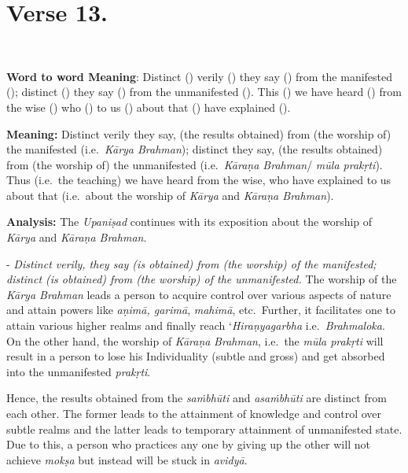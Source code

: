 \chapter{Verse 13.}

\begin{moolashloka}
\\
\end{moolashloka}

\textbf{Word to word Meaning}: Distinct () verily () they say () from the manifested (); distinct () they say () from the unmanifested (). This () we have heard () from the wise () who () to us () about that () have explained ().

\textbf{Meaning:} Distinct verily they say, (the results obtained) from (the worship of) the manifested (i.e.\ \emph{Kārya Brahman}); distinct they say, (the results obtained) from (the worship of) the unmanifested (i.e.\ \emph{Kāraṇa Brahman}/ \emph{mūla prakṛti}). Thus (i.e.\ the teaching) we have heard from the wise, who have explained to us about that (i.e.\ about the worship of \emph{Kārya} and \emph{Kāraṇa Brahman}).

\textbf{Analysis:} The \emph{Upaniṣad} continues with its exposition about the worship of \emph{Kārya} and \emph{Kāraṇa Brahman}.

 - \emph{Distinct verily, they say (is obtained) from (the worship) of the manifested; distinct (is obtained) from (the worship) of the unmanifested.} The worship of the \emph{Kārya Brahman} leads a person to acquire control over various aspects of nature and attain powers like \emph{aṇimā, garimā}, \emph{mahimā}, etc.\ Further, it facilitates one to attain various higher realms and finally reach `\emph{Hiraṇyagarbha} i.e.\ \emph{Brahmaloka}. On the other hand, the worship of \emph{Kāraṇa} \emph{Brahman}, i.e.\ the \emph{mūla prakṛti} will result in a person to lose his Individuality (subtle and gross) and get absorbed into the unmanifested \emph{prakṛti}.

Hence, the results obtained from the \emph{saṁbhūti} and \emph{asaṁbhūti} are distinct from each other. The former leads to the attainment of knowledge and control over subtle realms and the latter leads to temporary attainment of unmanifested state. Due to this, a person who practices any one by giving up the other will not achieve \emph{mokṣa} but instead will be stuck in \emph{avidyā}.

